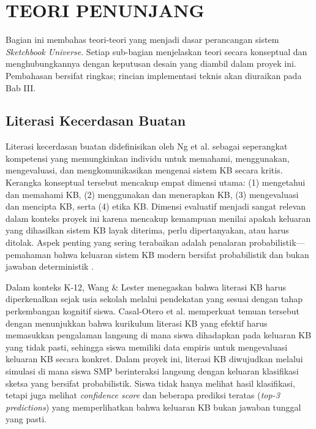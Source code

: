 \documentclass[12pt,a4paper,oneside,openany]{report}
\begin{document}
\section{TEORI PENUNJANG}
\label{sec:teori-penunjang}

Bagian ini membahas teori-teori yang menjadi dasar perancangan sistem \textit{Sketchbook Universe}. Setiap sub-bagian menjelaskan teori secara konseptual dan menghubungkannya dengan keputusan desain yang diambil dalam proyek ini. Pembahasan bersifat ringkas; rincian implementasi teknis akan diuraikan pada Bab III.

\subsection{Literasi Kecerdasan Buatan}
\label{subsec:literasi-kb}

Literasi kecerdasan buatan didefinisikan oleh Ng et al. \cite{ref1} sebagai seperangkat kompetensi yang memungkinkan individu untuk memahami, menggunakan, mengevaluasi, dan mengkomunikasikan mengenai sistem KB secara kritis. Kerangka konseptual tersebut mencakup empat dimensi utama: (1) mengetahui dan memahami KB, (2) menggunakan dan menerapkan KB, (3) mengevaluasi dan mencipta KB, serta (4) etika KB. Dimensi evaluatif menjadi sangat relevan dalam konteks proyek ini karena mencakup kemampuan menilai apakah keluaran yang dihasilkan sistem KB layak diterima, perlu dipertanyakan, atau harus ditolak. Aspek penting yang sering terabaikan adalah penalaran probabilistik---pemahaman bahwa keluaran sistem KB modern bersifat probabilistik dan bukan jawaban deterministik \cite{ref1}\cite{ref2}.

Dalam konteks K-12, Wang \& Lester \cite{ref11} menegaskan bahwa literasi KB harus diperkenalkan sejak usia sekolah melalui pendekatan yang sesuai dengan tahap perkembangan kognitif siswa. Casal-Otero et al. \cite{ref2} memperkuat temuan tersebut dengan menunjukkan bahwa kurikulum literasi KB yang efektif harus memasukkan pengalaman langsung di mana siswa dihadapkan pada keluaran KB yang tidak pasti, sehingga siswa memiliki data empiris untuk mengevaluasi keluaran KB secara konkret. Dalam proyek ini, literasi KB diwujudkan melalui simulasi di mana siswa SMP berinteraksi langsung dengan keluaran klasifikasi sketsa yang bersifat probabilistik. Siswa tidak hanya melihat hasil klasifikasi, tetapi juga melihat \textit{confidence score} dan beberapa prediksi teratas (\textit{top-3 predictions}) yang memperlihatkan bahwa keluaran KB bukan jawaban tunggal yang pasti.
\end{document}
